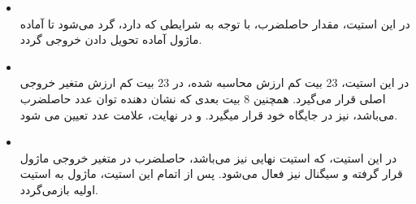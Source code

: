 \documentclass[12pt,titlepage,a4page , tikz , multi,table , svgnames,xcdraw]{article}
\begin{document}
\begin{itemize}
\item {} \\
در این استیت، مقدار حاصلضرب، با توجه به شرایطی که دارد، گرد می‌شود تا آماده ماژول آماده تحویل دادن خروجی گردد.
\item {} \\
در این استیت، 23 بیت کم ارزش  محاسبه شده، در 23 بیت کم ارزش متغیر خروجی اصلی قرار می‌گیرد. همچنین 8 بیت بعدی که نشان دهنده توان عدد حاصلضرب می‌باشد، نیز در جایگاه خود قرار میگیرد. و در نهایت، علامت عدد تعیین می شود. 
\item {} \\
        در این استیت، که استیت نهایی نیز می‌باشد، حاصلضرب در متغیر خروجی ماژول قرار گرفته و سیگنال  نیز فعال می‌شود. پس از اتمام این استیت، ماژول به استیت اولیه بازمی‌گردد.
\end{itemize}
\end{document}
